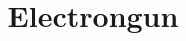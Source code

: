 \documentclass[10pt,a4paper]{article}
\begin{document}
\title{Electrongun}
\date{}
\author{}
\maketitle




\end{document}

